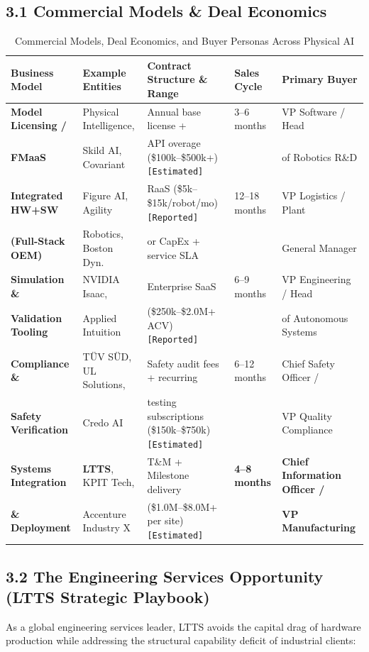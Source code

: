 \documentclass[11pt,a4paper]{article}
\begin{document}
\subsection{3.1 Commercial Models \& Deal Economics}
\begin{table}[h!]
\centering
\small
\begin{tabularx}{\textwidth}{@{}l p{3.2cm} p{3.2cm} l p{3.2cm}@{}}
\toprule
\textbf{Business Model} & \textbf{Example Entities} & \textbf{Contract Structure \& Range} & \textbf{Sales Cycle} & \textbf{Primary Buyer} \\
\midrule
\textbf{Model Licensing /} & Physical Intelligence, & Annual base license + & 3--6 months & VP Software / Head \\
\textbf{FMaaS} & Skild AI, Covariant & API overage (\$100k--\$500k+) \texttt{[Estimated]} & & of Robotics R\&D \\
\addlinespace
\textbf{Integrated HW+SW} & Figure AI, Agility & RaaS (\$5k--\$15k/robot/mo) \texttt{[Reported]} & 12--18 months & VP Logistics / Plant \\
\textbf{(Full-Stack OEM)} & Robotics, Boston Dyn. & or CapEx + service SLA & & General Manager \\
\addlinespace
\textbf{Simulation \&} & NVIDIA Isaac, & Enterprise SaaS & 6--9 months & VP Engineering / Head \\
\textbf{Validation Tooling} & Applied Intuition & (\$250k--\$2.0M+ ACV) \texttt{[Reported]} & & of Autonomous Systems \\
\addlinespace
\textbf{Compliance \&} & TÜV SÜD, UL Solutions, & Safety audit fees + recurring & 6--12 months & Chief Safety Officer / \\
\textbf{Safety Verification} & Credo AI & testing subscriptions (\$150k--\$750k) \texttt{[Estimated]} & & VP Quality Compliance \\
\addlinespace
\textbf{Systems Integration} & \textbf{LTTS}, KPIT Tech, & T\&M + Milestone delivery & \textbf{4--8 months} & \textbf{Chief Information Officer /} \\
\textbf{\& Deployment} & Accenture Industry X & (\$1.0M--\$8.0M+ per site) \texttt{[Estimated]} & & \textbf{VP Manufacturing} \\
\bottomrule
\end{tabularx}
\caption{Commercial Models, Deal Economics, and Buyer Personas Across Physical AI}
\end{table}

\subsection{3.2 The Engineering Services Opportunity (LTTS Strategic Playbook)}
As a global engineering services leader, LTTS avoids the capital drag of hardware production while addressing the structural capability deficit of industrial clients:
\end{document}
